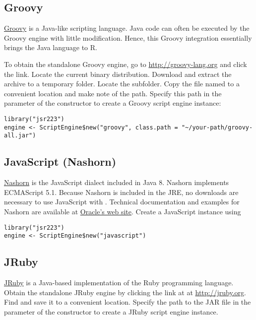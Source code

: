 \subsection{Groovy}

\href{http://groovy-lang.org}{Groovy} is a Java-like scripting language. Java code can often be executed by the Groovy engine with little modification. Hence, this Groovy integration essentially brings the Java language to R.

To obtain the standalone Groovy engine, go to \url{http://groovy-lang.org} and click the  link. Locate the current binary distribution. Download and extract the archive to a temporary folder. Locate the  subfolder. Copy the file named  to a convenient location and make note of the path. Specify this path in the  parameter of the  constructor to create a Groovy script engine instance:

\begin{verbatim}
library("jsr223")
engine <- ScriptEngine$new("groovy", class.path = "~/your-path/groovy-all.jar")
\end{verbatim}

\subsection{JavaScript (Nashorn)}

\href{https://docs.oracle.com/javase/8/docs/technotes/guides/scripting/nashorn/}{Nashorn} is the JavaScript dialect included in Java 8. Nashorn implements ECMAScript 5.1. Because Nashorn is included in the JRE, no downloads are necessary to use JavaScript with . Technical documentation and examples for Nashorn are available at \href{https://docs.oracle.com/javase/8/docs/technotes/guides/scripting/nashorn/}{Oracle's web site}. Create a JavaScript instance using

\begin{verbatim}
library("jsr223")
engine <- ScriptEngine$new("javascript")
\end{verbatim}

\subsection{JRuby}

\href{http://jruby.org}{JRuby} is a Java-based implementation of the Ruby programming language. Obtain the standalone JRuby engine by clicking the  link at at \url{http://jruby.org}. Find  and save it to a convenient location. Specify the path to the JAR file in the  parameter of the  constructor to create a JRuby script engine instance.

